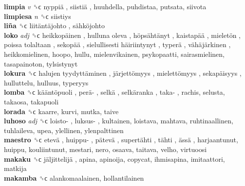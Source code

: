 \textbf{limpia} \emph{v}  ␝ϲ   nyppiä ,  siistiä , huuhdella, puhdistaa, putsata, siivota  \\
\textbf{limpiesa} \emph{n}  ␝ϲ  siistiys  \\
\textbf{liña} ␝ϲ   liitäntäjohto ,  sähköjohto   \\
\textbf{loko} \emph{adj}  ␝ϲ   heikkopäinen ,  hulluna oleva ,  höpsähtänyt ,  kaistapää ,  mieletön ,  poissa tolaltaan ,  sekopää ,  sielullisesti häiriintynyt ,  typerä ,  vähäjärkinen , heikkomielinen, hoopo, hullu, mielenvikainen, psykopaatti, sairasmielinen, tasapainoton, tylsistynyt  \\
\textbf{lokura} ␝ϲ   halujen tyydyttäminen ,  järjettömyys ,  mielettömyys ,  sekapäisyys , hulluttelu, hulluus, typeryys  \\
\textbf{lomba} ␝ϲ   kääntöpuoli ,  perä- ,  selkä ,  selkäranka ,  taka- , rachis, selusta, takaosa, takapuoli  \\
\textbf{lorada} ␝ϲ  kaarre, kurvi, mutka, taive  \\
\textbf{luhoso} \emph{adj}  ␝ϲ   loisto- ,  luksus- , kultainen, loistava, mahtava, ruhtinaallinen, tuhlaileva, upea, ylellinen, ylenpalttinen  \\
\textbf{maestro} ␝ϲ   etevä ,  huippu- ,  pätevä ,  supertähti ,  tähti ,  ässä , harjaantunut, huippu, kouliintunut, mestari, nero, osaava, taitava, velho, virtuoosi  \\
\textbf{makaku} ␝ϲ   jäljittelijä , apina, apinoija, copycat, ihmisapina, imitaattori, matkija  \\
\textbf{makamba} ␝ϲ  alankomaalainen, hollantilainen  \\
